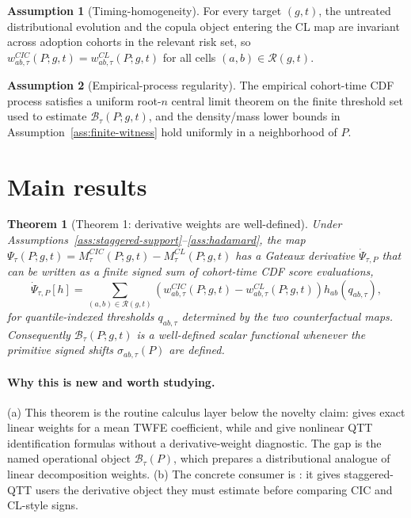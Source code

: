 \documentclass[11pt]{article}
\theoremstyle{definition}
\newtheorem{assumption}{Assumption}
\theoremstyle{plain}
\newtheorem{theorem}{Theorem}
\theoremstyle{remark}
\begin{document}
\begin{assumption}[Timing-homogeneity]\label{ass:timing-homogeneity}
For every target \((g,t)\), the untreated distributional evolution and the copula object entering the CL map are invariant across adoption cohorts in the relevant risk set, so \(w^{CIC}_{ab,\tau}(P;g,t)=w^{CL}_{ab,\tau}(P;g,t)\) for all cells \((a,b)\in\mathcal R(g,t)\).
\end{assumption}

\begin{assumption}[Empirical-process regularity]\label{ass:empirical}
The empirical cohort-time CDF process satisfies a uniform root-\(n\) central limit theorem on the finite threshold set used to estimate \(\mathcal B_\tau(P;g,t)\), and the density/mass lower bounds in Assumption~\ref{ass:finite-witness} hold uniformly in a neighborhood of \(P\).
\end{assumption}

\section{Main results}
\begin{theorem}[Theorem 1: derivative weights are well-defined]\label{thm:derivative-well-defined}
Under Assumptions~\ref{ass:staggered-support}--\ref{ass:hadamard}, the map \(\Psi_\tau(P;g,t)=M_\tau^{CIC}(P;g,t)-M_\tau^{CL}(P;g,t)\) has a Gateaux derivative \(\dot\Psi_{\tau,P}\) that can be written as a finite signed sum of cohort-time CDF score evaluations,
\[
\dot\Psi_{\tau,P}[h]=
\sum_{(a,b)\in\mathcal R(g,t)}
\left(w^{CIC}_{ab,\tau}(P;g,t)-w^{CL}_{ab,\tau}(P;g,t)\right) h_{ab}(q_{ab,\tau}),
\]
for quantile-indexed thresholds \(q_{ab,\tau}\) determined by the two counterfactual maps.  Consequently \(\mathcal B_\tau(P;g,t)\) is a well-defined scalar functional whenever the primitive signed shifts \(\sigma_{ab,\tau}(P)\) are defined.
\end{theorem}
\paragraph{Why this is new and worth studying.}
(a) This theorem is the routine calculus layer below the novelty claim: \citet{GoodmanBacon2021} gives exact linear weights for a mean TWFE coefficient, while \citet{CallawayLi2019} and \citet{LiLin2024} give nonlinear QTT identification formulas without a derivative-weight diagnostic.  The gap is the named operational object \(\mathcal B_\tau(P)\), which prepares a distributional analogue of linear decomposition weights.  (b) The concrete consumer is \citet{LiLin2024}: it gives staggered-QTT users the derivative object they must estimate before comparing CIC and CL-style signs.
\end{document}
